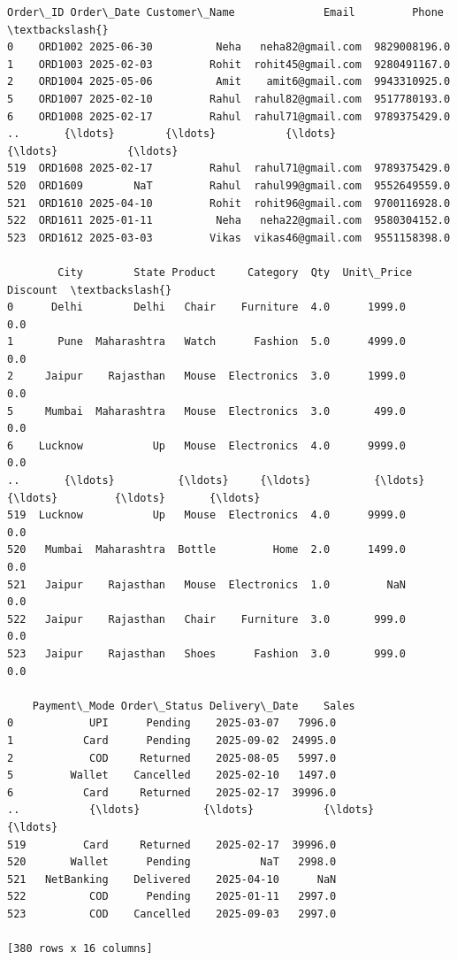 \documentclass[11pt]{article}
\makeatletter
\newcommand{\boxspacing}{\kern\kvtcb@left@rule\kern\kvtcb@boxsep}
\newcommand{\prompt}[4]{
        {\ttfamily\llap{{\color{#2}[#3]:\hspace{3pt}#4}}\vspace{-\baselineskip}}
    }
\makeatother
\begin{document}
            \begin{tcolorbox}[breakable, size=fbox, boxrule=.5pt, pad at break*=1mm, opacityfill=0]
\prompt{Out}{outcolor}{37}{\boxspacing}
\begin{Verbatim}[commandchars=\\\{\}]
    Order\_ID Order\_Date Customer\_Name              Email         Phone  \textbackslash{}
0    ORD1002 2025-06-30          Neha   neha82@gmail.com  9829008196.0
1    ORD1003 2025-02-03         Rohit  rohit45@gmail.com  9280491167.0
2    ORD1004 2025-05-06          Amit    amit6@gmail.com  9943310925.0
5    ORD1007 2025-02-10         Rahul  rahul82@gmail.com  9517780193.0
6    ORD1008 2025-02-17         Rahul  rahul71@gmail.com  9789375429.0
..       {\ldots}        {\ldots}           {\ldots}                {\ldots}           {\ldots}
519  ORD1608 2025-02-17         Rahul  rahul71@gmail.com  9789375429.0
520  ORD1609        NaT         Rahul  rahul99@gmail.com  9552649559.0
521  ORD1610 2025-04-10         Rohit  rohit96@gmail.com  9700116928.0
522  ORD1611 2025-01-11          Neha   neha22@gmail.com  9580304152.0
523  ORD1612 2025-03-03         Vikas  vikas46@gmail.com  9551158398.0

        City        State Product     Category  Qty  Unit\_Price  Discount  \textbackslash{}
0      Delhi        Delhi   Chair    Furniture  4.0      1999.0       0.0
1       Pune  Maharashtra   Watch      Fashion  5.0      4999.0       0.0
2     Jaipur    Rajasthan   Mouse  Electronics  3.0      1999.0       0.0
5     Mumbai  Maharashtra   Mouse  Electronics  3.0       499.0       0.0
6    Lucknow           Up   Mouse  Electronics  4.0      9999.0       0.0
..       {\ldots}          {\ldots}     {\ldots}          {\ldots}  {\ldots}         {\ldots}       {\ldots}
519  Lucknow           Up   Mouse  Electronics  4.0      9999.0       0.0
520   Mumbai  Maharashtra  Bottle         Home  2.0      1499.0       0.0
521   Jaipur    Rajasthan   Mouse  Electronics  1.0         NaN       0.0
522   Jaipur    Rajasthan   Chair    Furniture  3.0       999.0       0.0
523   Jaipur    Rajasthan   Shoes      Fashion  3.0       999.0       0.0

    Payment\_Mode Order\_Status Delivery\_Date    Sales
0            UPI      Pending    2025-03-07   7996.0
1           Card      Pending    2025-09-02  24995.0
2            COD     Returned    2025-08-05   5997.0
5         Wallet    Cancelled    2025-02-10   1497.0
6           Card     Returned    2025-02-17  39996.0
..           {\ldots}          {\ldots}           {\ldots}      {\ldots}
519         Card     Returned    2025-02-17  39996.0
520       Wallet      Pending           NaT   2998.0
521   NetBanking    Delivered    2025-04-10      NaN
522          COD      Pending    2025-01-11   2997.0
523          COD    Cancelled    2025-09-03   2997.0

[380 rows x 16 columns]
\end{Verbatim}
\end{tcolorbox}
        
\end{document}
